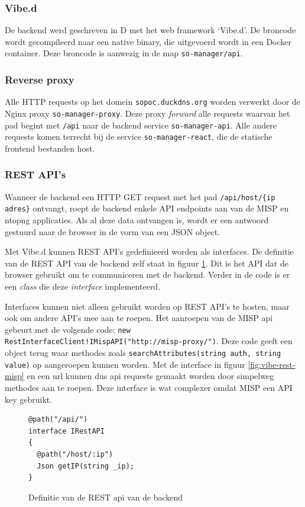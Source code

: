 \documentclass[a4paper, 12pt]{report}
\begin{document}
\subsubsection{Vibe.d}
De backend werd geschreven in D met het web framework `Vibe.d'.
De broncode wordt gecompileerd naar een native binary, die uitgevoerd wordt in een Docker container.
Deze broncode is aanwezig in de map \lstinline|so-manager/api|.

\subsubsection{Reverse proxy}
Alle HTTP requests op het domein \lstinline|sopoc.duckdns.org| worden verwerkt door de Nginx proxy \lstinline|so-manager-proxy|.
Deze proxy \emph{forward} alle requests waarvan het pad begint met \lstinline|/api| naar de backend service \lstinline|so-manager-api|.
Alle andere requests komen terrecht bij de service \lstinline|so-manager-react|, die de statische frontend bestanden host.

\subsubsection{REST API's}
Wanneer de backend een HTTP GET request met het pad \lstinline|/api/host/{ip adres}| ontvangt, roept de backend enkele API endpoints aan van de MISP en ntopng applicaties.
Als al deze data ontvangen is, wordt er een antwoord gestuurd naar de browser in de vorm van een JSON object.

Met Vibe.d kunnen REST API's gedefinieerd worden als interfaces.
De definitie van de REST API van de backend zelf staat in figuur \ref{fig:vibe-rest-server}.
Dit is het API dat de browser gebruikt om te communiceren met de backend.
Verder in de code is er een \emph{class} die deze \emph{interface} implementeerd.

Interfaces kunnen niet alleen gebruikt worden op REST API's te hosten, maar ook om andere API's mee aan te roepen.
Het aanroepen van de MISP api gebeurt met de volgende code: \lstinline|new RestInterfaceClient!IMispAPI("http://misp-proxy/")|.
Deze code geeft een object terug waar methodes zoals \lstinline|searchAttributes(string auth, string value)| op aangeroepen kunnen worden.
Met de interface in figuur \ref{fig:vibe-rest-misp} en een url kunnen dus api requests gemaakt worden door simpelweg methodes aan te roepen.
Deze interface is wat complexer omdat MISP een API key gebruikt.

\begin{figure}[H]
  \begin{lstlisting}
@path("/api/")
interface IRestAPI
{
  @path("/host/:ip")
  Json getIP(string _ip);
}
  \end{lstlisting}
  \caption{Definitie van de REST api van de backend}
  \label{fig:vibe-rest-server}
\end{figure}
\end{document}
